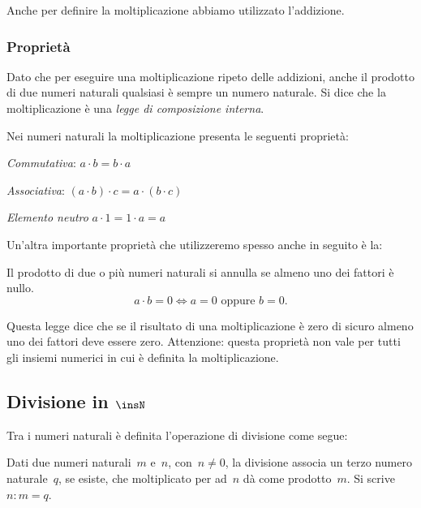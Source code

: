 \osservazione Anche per definire la moltiplicazione abbiamo utilizzato 
l'addizione.

\subsubsection{Proprietà}

Dato che per eseguire una moltiplicazione ripeto delle addizioni, 
anche il prodotto di due numeri  naturali qualsiasi è sempre un numero 
naturale. 
Si dice che la moltiplicazione è una \emph{legge di composizione interna}. 

Nei numeri naturali la moltiplicazione presenta le seguenti proprietà:

\begin{itemize*}
 \item \emph{Commutativa}: \(a \cdot b = b \cdot a\)
 \item \emph{Associativa}: \((a \cdot b) \cdot c = a \cdot (b \cdot c)\)
 \item \emph{Elemento neutro} \(a \cdot 1 = 1 \cdot a = a\)
\end{itemize*}

Un'altra importante proprietà che utilizzeremo spesso anche in seguito è la:

\begin{legge}
 Il prodotto di due o più numeri naturali si annulla se almeno uno dei 
fattori è nullo.
\[ a\cdot b=0\Leftrightarrow a=0\text{ oppure }b=0. \]
\end{legge}

Questa legge dice che se il risultato di una moltiplicazione è zero di 
sicuro almeno uno dei fattori deve essere zero. Attenzione: questa proprietà 
non vale per tutti gli insiemi numerici in cui è definita la 
moltiplicazione.

\subsection{Divisione in \(\insN\)}

Tra i numeri naturali è definita l'operazione di divisione come segue:

\begin{definizione}
Dati due numeri naturali~\(m\) e~\(n\), con~\(n \neq 0\), la divisione associa 
un terzo numero naturale~\(q\), se esiste, che moltiplicato per ad~\(n\) dà 
come prodotto~\(m\).
Si scrive~\(n : m = q\).
\end{definizione}

